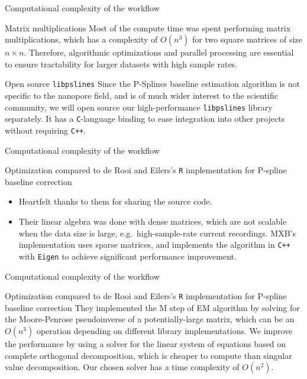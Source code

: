\documentclass{beamer}
\begin{document}
\begin{frame}{Computational complexity of the workflow}
    \begin{block}{Matrix multiplications}
        Most of the compute time was spent performing matrix multiplications, which has a complexity of $O(n^3)$ for two square matrices of size $n\times n$. Therefore, algorithmic optimizations and parallel processing are essential to ensure tractability for larger datasets with high sample rates.
    \end{block}\pause

    \begin{block}{Open source \texttt{libpslines}}
        Since the P-Splines baseline estimation algorithm is not specific to the nanopore field, and is of much wider interest to the scientific community, we will open source our high-performance \texttt{libpslines} library separately. It has a \texttt{C}-language binding to ease integration into other projects without requiring \texttt{C++}.
    \end{block}

\end{frame}

\begin{frame}{Computational complexity of the workflow}
    \begin{block}{Optimization compared to de Rooi and Eilers's \texttt{R} implementation for P-spline baseline correction}
        \begin{itemize}
            \item Heartfelt thanks to them for sharing the source code.\pause
            \item Their linear algebra was done with dense matrices, which are not scalable when the data size is large, e.g.~high-sample-rate current recordings. MXB's implementation uses sparse matrices, and implements the algorithm in \texttt{C++} with \texttt{Eigen} to achieve significant performance improvement.
        \end{itemize}
    \end{block}
\end{frame}

\begin{frame}{Computational complexity of the workflow}
    \begin{block}{Optimization compared to de Rooi and Eilers's \texttt{R} implementation for P-spline baseline correction}
        They implemented the M step of EM algorithm by solving for the Moore-Penrose pseudoinverse of a potentially-large matrix, which can be an $O(n^3)$ operation depending on different library implementations. We improve the performance by using a solver for the linear system of equations based on complete orthogonal decomposition, which is cheaper to compute than singular value decomposition. Our chosen solver has a time complexity of $O(n^2)$.
    \end{block}
\end{frame}
\end{document}
